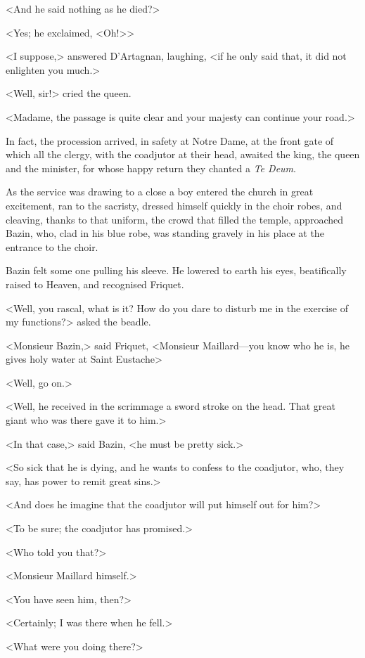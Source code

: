 <And he said nothing as he died?>

<Yes; he exclaimed, <Oh!>>

<I suppose,> answered D'Artagnan, laughing, <if he only said that, it did not enlighten you much.>

<Well, sir!> cried the queen.

<Madame, the passage is quite clear and your majesty can continue your road.>

In fact, the procession arrived, in safety at Notre Dame, at the front gate of which all the clergy, with the coadjutor at their head, awaited the king, the queen and the minister, for whose happy return they chanted a \textit{Te Deum}.

As the service was drawing to a close a boy entered the church in great excitement, ran to the sacristy, dressed himself quickly in the choir robes, and cleaving, thanks to that uniform, the crowd that filled the temple, approached Bazin, who, clad in his blue robe, was standing gravely in his place at the entrance to the choir.

Bazin felt some one pulling his sleeve. He lowered to earth his eyes, beatifically raised to Heaven, and recognised Friquet.

<Well, you rascal, what is it? How do you dare to disturb me in the exercise of my functions?> asked the beadle.

<Monsieur Bazin,> said Friquet, <Monsieur Maillard—you know who he is, he gives holy water at Saint Eustache\longdash>

<Well, go on.>

<Well, he received in the scrimmage a sword stroke on the head. That great giant who was there gave it to him.>

<In that case,> said Bazin, <he must be pretty sick.>

<So sick that he is dying, and he wants to confess to the coadjutor, who, they say, has power to remit great sins.>

<And does he imagine that the coadjutor will put himself out for him?>

<To be sure; the coadjutor has promised.>

<Who told you that?>

<Monsieur Maillard himself.>

<You have seen him, then?>

<Certainly; I was there when he fell.>

<What were you doing there?>

